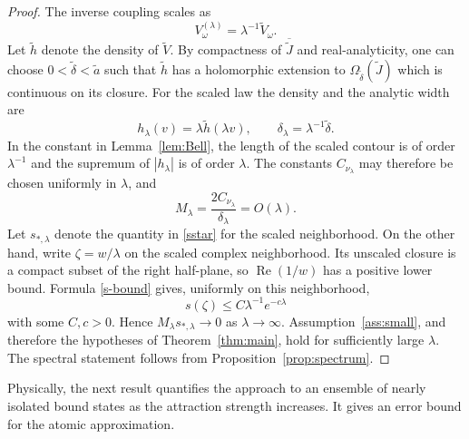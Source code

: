 \documentclass[12pt,a4paper]{article}
\numberwithin{equation}{section}
\newcommand{\Om}{\Omega}
\renewcommand{\Re}{\operatorname{Re}}
\begin{document}
\begin{proof}
The inverse coupling scales as
$$
V_\omega^{(\lambda)}=\lambda^{-1}\widetilde V_\omega.
$$
Let $\widetilde h$ denote the density of $\widetilde V$.  By compactness of
$\overline{\widetilde J}$ and real-analyticity, one can choose
$0<\widetilde\delta<\widetilde a$ such that $\widetilde h$ has a holomorphic extension to
$\Om_{\widetilde\delta}(\widetilde J)$ which is continuous on its closure.
For the scaled law the density and the analytic width are
\begin{equation}
 h_\lambda(v)=\lambda\widetilde h(\lambda v),
 \qquad \delta_\lambda=\lambda^{-1}\widetilde\delta.
\label{scaled-density}
\end{equation}
In the constant in Lemma~\ref{lem:Bell}, the length of the scaled contour is
of order $\lambda^{-1}$ and the supremum of $|h_\lambda|$ is of order
$\lambda$.  The constants $C_{\nu_\lambda}$ may therefore be chosen uniformly
in $\lambda$, and
\begin{equation}
 M_\lambda=\frac{2C_{\nu_\lambda}}{\delta_\lambda}
 =O(\lambda).
\label{scaled-M}
\end{equation}
Let $s_{*,\lambda}$ denote the quantity in \eqref{sstar} for the scaled
neighborhood.
On the other hand, write $\zeta=w/\lambda$ on the scaled complex
neighborhood.  Its unscaled closure is a compact subset of the right
half-plane, so $\Re(1/w)$ has a positive lower bound.  Formula
\eqref{s-bound} gives, uniformly on this neighborhood,
$$
s(\zeta)\le C\lambda^{-1}e^{-c\lambda}
$$
with some $C,c>0$.  Hence $M_\lambda s_{*,\lambda}\to0$ as
$\lambda\to\infty$.  Assumption~\ref{ass:small}, and therefore the hypotheses
of Theorem~\ref{thm:main}, hold for sufficiently large $\lambda$.
The spectral statement follows from Proposition~\ref{prop:spectrum}.
\end{proof}

Physically, the next result quantifies the approach to an ensemble of nearly
isolated bound states as the attraction strength increases.  It gives an error bound for the atomic approximation.
\end{document}
